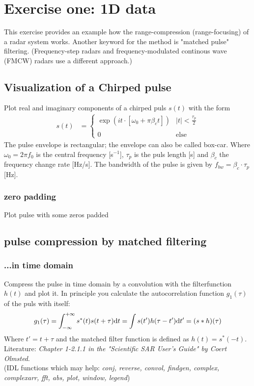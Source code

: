 \section{Exercise one: 1D data}
This exercise provides an example how the range-compression (range-focusing) of a radar system works. Another keyword for the method is "{}matched pulse"{} filtering. (Frequency-step radars and frequency-modulated continous wave (FMCW) radars use a different approach.)
\subsection{Visualization of a Chirped pulse}
Plot real and imaginary components of a chirped puls $s(t)$ with the form
\begin{align}
  s(t) &= \left\{\begin{array}{ll}
       \exp\left(i t\cdot\left[\omega_0 + \pi\beta_c t\right]\right)&|t| < \frac{\tau_p}{2}\\
       \\
       0 & \text{else}
       \end{array}\right.
\end{align}
The pulse envelope is rectangular; the envelope can also be called box-car. Where $\omega_0 = 2\pi f_0$ is the central frequency [s$^{-1}$], $\tau_p$ is the puls length [s] and $\beta_c$ the frequency change rate [Hz/s]. The bandwidth of the pulse is given by $f_{bw} = \beta_c\cdot \tau_p$ [Hz].

\subsubsection{zero padding}
Plot pulse with some zeros padded

\subsection{pulse compression by matched filtering}
\subsubsection{...in time domain}\label{sec:boxcarpulse}
Compress the pulse in time domain by a convolution with the filterfunction $h(t)$ and plot it. In principle you calculate the autocorrelation function $g_1(\tau)$ of the puls with itself:
\begin{align}
g_1(\tau) = \int_{-\infty}^{+\infty}s^*(t)s(t+\tau)\text{d} t = \int s(t')h(\tau-t') \text{d} t' = (s*h)(\tau)
\end{align}
Where $t' = t+\tau$ and the matched filter function is defined as $h(t) = s^*(-t)$.\\
Literature: \textit{Chapter 1-2.1.1 in the "Scientific SAR User's Guide" by Coert Olmsted}.\\
(IDL functions which may help: \textit{conj, reverse, convol, findgen, complex, complexarr, fft, abs, plot, window, legend})


